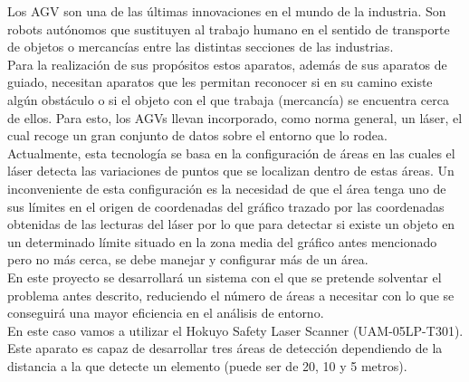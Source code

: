 Los AGV son una de las últimas innovaciones en el mundo de la industria. Son robots autónomos que sustituyen al trabajo humano en el sentido de transporte de objetos o mercancías entre las distintas secciones de las industrias. \\
Para la realización de sus propósitos estos aparatos, además de sus aparatos de guiado, necesitan aparatos que les permitan reconocer si en su camino existe algún obstáculo o si el objeto con el que trabaja (mercancía) se encuentra cerca de ellos. Para esto, los AGVs llevan incorporado, como norma general, un láser, el cual recoge un gran conjunto de datos sobre el entorno que lo rodea.\\
Actualmente, esta tecnología se basa en la configuración de áreas en las cuales el láser detecta las variaciones de puntos que se localizan dentro de estas áreas. Un inconveniente de esta configuración es la necesidad de que el área tenga uno de sus límites en el origen de coordenadas del gráfico trazado por las coordenadas obtenidas de las lecturas del láser por lo que para detectar si existe un objeto en un determinado límite situado en la zona media del gráfico antes mencionado pero no más cerca, se debe manejar y configurar más de un área.\\
En este proyecto se desarrollará un sistema con el que se pretende solventar el problema antes descrito, reduciendo el número de áreas a necesitar con lo que se conseguirá una mayor eficiencia en el análisis de entorno.\\
En este caso vamos a utilizar el Hokuyo Safety Laser Scanner (UAM-05LP-T301). Este aparato es capaz de desarrollar tres áreas de detección dependiendo de la distancia a la que detecte un elemento (puede ser de 20, 10 y 5 metros).\\